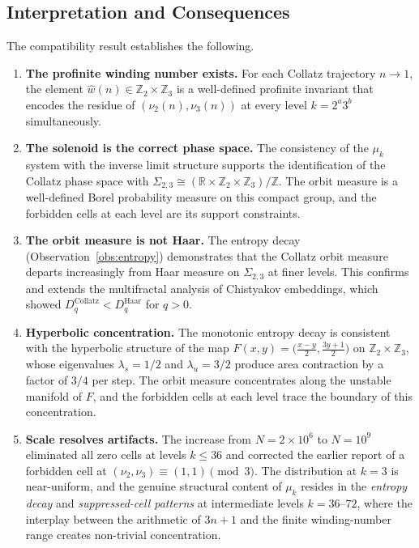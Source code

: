 \documentclass[11pt,a4paper]{article}
\newcommand{\Z}{\mathbb{Z}}
\newcommand{\R}{\mathbb{R}}
\theoremstyle{plain}
\theoremstyle{definition}
\begin{document}
\subsection{Interpretation and Consequences}

The compatibility result establishes the following.

\begin{enumerate}
    \item \textbf{The profinite winding number exists.}
    For each Collatz trajectory $n \to 1$, the element
    $\hat{w}(n) \in \Z_2 \times \Z_3$ is a well-defined profinite
    invariant that encodes the residue of $(\nu_2(n), \nu_3(n))$ at
    every level $k = 2^a 3^b$ simultaneously.

    \item \textbf{The solenoid is the correct phase space.}
    The consistency of the $\mu_k$ system with the inverse limit
    structure supports the identification of the Collatz phase space
    with $\Sigma_{2,3} \cong (\R \times \Z_2 \times \Z_3)/\Z$.
    The orbit measure is a well-defined Borel probability measure on
    this compact group, and the forbidden cells at each level are its
    support constraints.

    \item \textbf{The orbit measure is not Haar.}
    The entropy decay (Observation~\ref{obs:entropy}) demonstrates
    that the Collatz orbit measure departs increasingly from Haar
    measure on $\Sigma_{2,3}$ at finer levels.  This confirms and
    extends the multifractal analysis of Chistyakov embeddings, which
    showed $D_q^{\text{Collatz}} < D_q^{\text{Haar}}$ for $q > 0$.

    \item \textbf{Hyperbolic concentration.}
    The monotonic entropy decay is consistent with the hyperbolic
    structure of the map $F(x,y) = \bigl(\frac{x-y}{2},
    \frac{3y+1}{2}\bigr)$ on $\Z_2 \times \Z_3$, whose eigenvalues
    $\lambda_s = 1/2$ and $\lambda_u = 3/2$ produce area contraction
    by a factor of $3/4$ per step.  The orbit measure concentrates
    along the unstable manifold of $F$, and the forbidden cells at
    each level trace the boundary of this concentration.

    \item \textbf{Scale resolves artifacts.}
    The increase from $N = 2 \times 10^6$ to $N = 10^9$ eliminated
    all zero cells at levels $k \leq 36$ and corrected the earlier
    report of a forbidden cell at $(\nu_2, \nu_3) \equiv (1,1)
    \pmod{3}$.  The distribution at $k = 3$ is near-uniform, and
    the genuine structural content of $\mu_k$ resides in the
    \emph{entropy decay} and \emph{suppressed-cell patterns} at
    intermediate levels $k = 36$--$72$, where the interplay between
    the arithmetic of $3n+1$ and the finite winding-number range
    creates non-trivial concentration.
\end{enumerate}
\end{document}
